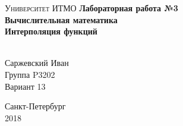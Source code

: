 \begin{titlepage}
\begin{center}

\textsc{Университет ИТМО}
\vfill
\textbf{Лабораторная работа №3\\[4mm]
Вычислительная математика\\[16mm]
Интерполяция функций}\\[16mm]
\begin{flushright}
~\\[2mm]Саржевский Иван
~\\[2mm]Группа P3202
~\\[2mm]Вариант 13
\end{flushright}
\vfill
Санкт-Петербург\\[2mm]
2018

\end{center}
\end{titlepage}
